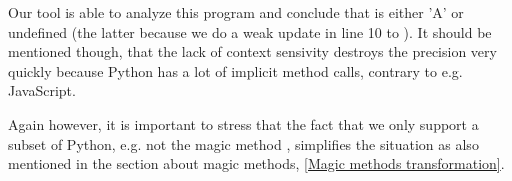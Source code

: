 Our tool is able to analyze this program and conclude that  is either 'A' or undefined (the latter because we do a weak update in line 10 to ). It should be mentioned though, that the lack of context sensivity destroys the precision very quickly because Python has a lot of implicit method calls, contrary to e.g. JavaScript.

Again however, it is important to stress that the fact that we only support a subset of Python, e.g. not the magic method , simplifies the situation as also mentioned in the section about magic methods, \ref{Magic methods transformation}.
